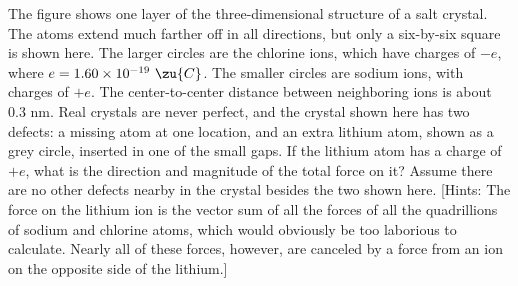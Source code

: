 The figure shows one layer of the three-dimensional
structure of a salt crystal. The atoms extend much farther
off in all directions, but only a six-by-six square is shown
here. The larger circles are the chlorine ions, which have
charges of $-e$, where $e=1.60\times10^{-19}\ \zu{C}$. The smaller circles are sodium ions, with
charges of $+e$. The center-to-center distance between
neighboring ions is about 0.3 nm. Real crystals are never
perfect, and the crystal shown here has two defects: a
missing atom at one location, and an extra lithium atom,
shown as a grey circle, inserted in one of the small gaps.
If the lithium atom has a charge of $+e$, what is the
direction and magnitude of the total force on it? Assume
there are no other defects nearby in the crystal besides the
two shown here. [Hints: The force on the lithium ion is the
vector sum of all the forces of all the quadrillions of
sodium and chlorine atoms, which would obviously be too
laborious to calculate. Nearly all of these forces,
however, are canceled by a force from an ion on the opposite
side of the lithium.]\answercheck
